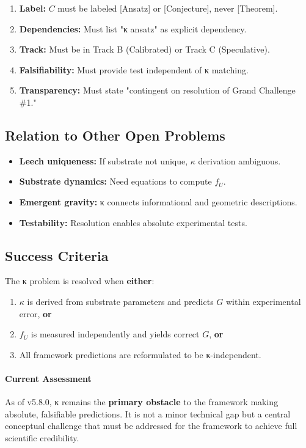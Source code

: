 \begin{tcolorbox}[colback=yellow!5!white,colframe=yellow!75!black,title=Protocol: Handling κ-Dependent Claims]
\begin{enumerate}
\item \textbf{Label:} $C$ must be labeled [Ansatz] or [Conjecture], never [Theorem].
\item \textbf{Dependencies:} Must list "κ ansatz" as explicit dependency.
\item \textbf{Track:} Must be in Track B (Calibrated) or Track C (Speculative).
\item \textbf{Falsifiability:} Must provide test independent of κ matching.
\item \textbf{Transparency:} Must state "contingent on resolution of Grand Challenge \#1."
\end{enumerate}
\end{tcolorbox}

\subsection{Relation to Other Open Problems}

\begin{itemize}
\item \textbf{Leech uniqueness:} If substrate not unique, $\kappa$ derivation ambiguous.
\item \textbf{Substrate dynamics:} Need equations to compute $f_U$.
\item \textbf{Emergent gravity:} κ connects informational and geometric descriptions.
\item \textbf{Testability:} Resolution enables absolute experimental tests.
\end{itemize}

\subsection{Success Criteria}

The κ problem is resolved when \textbf{either}:
\begin{enumerate}
\item $\kappa$ is derived from substrate parameters and predicts $G$ within experimental error, \textbf{or}
\item $f_U$ is measured independently and yields correct $G$, \textbf{or}  
\item All framework predictions are reformulated to be κ-independent.
\end{enumerate}

\paragraph{Current Assessment}
As of v5.8.0, κ remains the \textbf{primary obstacle} to the framework making absolute, falsifiable predictions. It is not a minor technical gap but a central conceptual challenge that must be addressed for the framework to achieve full scientific credibility.
